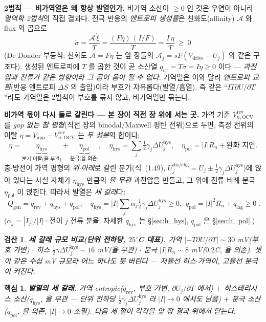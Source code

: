 \documentclass[11pt,a4paper]{article}
\newtheorem*{keybox}{핵심}
\newtheorem*{verifybox}{검산}
\newcommand{\app}{\mathrm{app}}
\newcommand{\drive}{\mathrm{drive}}
\newcommand{\OCV}{\mathrm{OCV}}
\newcommand{\dis}{\mathrm{dis}}
\newcommand{\chg}{\mathrm{chg}}
\newcommand{\hys}{\mathrm{hys}}
\newcommand{\pol}{\mathrm{pol}}
\newcommand{\rev}{\mathrm{rev}}
\newcommand{\irr}{\mathrm{irr}}
\newcommand{\gen}{\mathrm{gen}}
\newcommand{\lag}{\mathrm{lag}}
\begin{document}
\textbf{2법칙 — 비가역열은 왜 항상 발열인가.} 비가역 소산이 $\ge0$ 인 것은 우연이 아니라 \emph{열역학 2법칙}의
직접 결과다. 전극 반응의 \emph{엔트로피 생성률}은 친화도(affinity) $\mathcal A$ 와 flux 의 곱으로
\begin{equation}
\dot\sigma=\frac{\mathcal A\,\dot\xi}{T}=\frac{(F\eta)\,(I/F)}{T}=\frac{I\,\eta}{T}\ \ge\ 0
\label{eq:h_entprod}
\end{equation}
(De Donder 부등식; 친화도 $\mathcal A=F\eta$ 는 앞 장들의 $\mathcal A_j=sF(V_\drive-U_j)$ 와 같은 구조다). 생성된
엔트로피에 $T$ 를 곱한 것이 곧 소산열 $q_\irr=T\dot\sigma=I\eta\ge0$ 이다 — \emph{과전압과 전류가 같은 방향이라
그 곱이 음이 될 수 없다}. 가역열은 이와 달리 \emph{엔트로피 교환}(반응 엔트로피 $\Delta S$ 의 출입)이라 부호가
자유롭다(발열/흡열). 즉 같은 ``$IT\partial U/\partial T$''라도 가역열은 2법칙이 부호를 묶지 않고, 비가역열만 묶는다.

\textbf{비가역 몫이 다시 둘로 갈린다 — 본 장이 직전 장 위에 서는 곳.} 가역 기준 $V_{n,\OCV}^\rev$ 를 \emph{gap
없는 참 평형}(직전 장의 binodal/Maxwell 평탄 전위)으로 두면, 측정 전위의 이탈 $\eta=V_\app-V_{n,\OCV}^\rev$ 는
\emph{두 성분}의 합이다:
\begin{equation}
\eta=\underbrace{\eta_\hys}_{\text{분기 이탈(율 무관)}}+\underbrace{\eta_\pol}_{\text{분극(율 의존)}},\quad
\eta_\hys=\sum_j\tfrac12\gamma_j\Delta U_j^\hys,\quad \eta_\pol=|I|R_n+\text{완화 지연}.
\label{eq:h_eta_split}
\end{equation}
충$\cdot$방전이 가역 평형의 \emph{위$\cdot$아래}로 갈린 분기(식~(1.49), $U_j^{\dis/\chg}=U_j\pm\tfrac12\gamma_j
\Delta U_j^\hys$)에 앉아 있다는 사실 자체가 $\eta_\hys$ 만큼의 \emph{율 무관} 과전압을 만들고, 그 위에 전류 비례
분극 $\eta_\pol$ 이 얹힌다. 따라서 발열은 \emph{세 갈래}다:
\begin{equation}
\boxed{\;Q_\gen=q_\rev+q_\hys+q_\pol,\quad q_\hys=|I|\textstyle\sum_j\alpha_j\tfrac12\gamma_j\Delta U_j^\hys\ge0,\ \ q_\pol=|I|^2R_n+q_\lag\ge0\;.}
\label{eq:h_three}
\end{equation}
($\alpha_j=|I_j|/|I|$=전이 $j$ 전류 분율; 자세한 $q_\hys$ 는 \S\ref{sec:h_hys}, $q_\pol$ 은 \S\ref{sec:h_pol}.)
\begin{verifybox}
\textbf{세 갈래 규모 비교(단위 전하당, $25^\circ$C 대표).} 가역 $|{-}T\partial U/\partial T|\sim30$ mV(부호 가변)
$\cdot$ 히스 $\tfrac12\gamma\Delta U_j^\hys\sim16$ mV(율 무관) $\cdot$ 분극 $|I|R_n\sim8$ mV($0.2$C, 율 의존). 셋이
\emph{같은 수십 mV 규모}라 어느 하나도 못 버린다 — 저율선 히스$\cdot$가역이, 고율선 분극이 커진다.
\end{verifybox}
\begin{keybox}
\textbf{발열의 세 갈래.} \emph{가역 entropic}($q_\rev$, 부호 가변, $\partial U_j/\partial T$ 에서) $+$
\emph{히스테리시스 소산}($q_\hys$, \emph{율 무관} — 단위 전하당 $\tfrac12\gamma_j\Delta U_j^\hys$ 라 $|I|\to0$ 에서도
남음) $+$ \emph{분극 소산}($q_\pol$, 율 의존, $|I|\to0$ 소멸). 다음 세 절이 각각을 앞 장 결과 위에서 닫는다.
\end{keybox}
\end{document}

